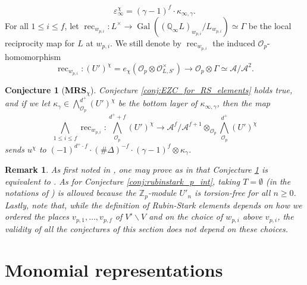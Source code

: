 \documentclass[12pt]{amsart}
\newcommand\bQ{\mathbb{Q}}
\newcommand\Zp{{\mathbb{Z}_p}}
\newcommand\cA{\mathcal{A}}
\newcommand\cO{\mathcal{O}}
\DeclareMathOperator{\Gal}{Gal}
\DeclareMathOperator{\rec}{rec}
\theoremstyle{defstyle}
\newtheorem{remark}[subsubsection]{Remark}
\theoremstyle{thmstyle}
\newtheorem{conjecture}[subsubsection]{Conjecture}
\begin{document}
$$\varepsilon_\infty^\chi = (\gamma-1)^f \cdot \kappa_{\infty,\gamma}.$$
For all $1\leq i \leq f$, let $\rec_{w_{p,i}} : L^\times \longrightarrow \Gal((\bQ_\infty L)_{w_{p,i}}/L_{w_{p,i}})\simeq \Gamma$ be the local reciprocity map for $L$ at ${w_{p,i}}$. We still denote by $\rec_{w_{p,i}}$ the induced $\cO_p$-homomorphism 
$$\rec_{w_{p,i}} : (U')^\chi=e_\chi (\cO_p\otimes \cO_{L,S'}^\times) \longrightarrow \cO_p \otimes \Gamma \simeq \cA/\cA^2.$$
\begin{conjecture}[\textbf{MRS}$_\chi$]\label{conj:MRS_chi}
	Conjecture \ref{conj:EZC_for_RS_elements} holds true, and if we let $\kappa_\gamma \in {\bigwedge}^{d^+}_{\cO_p} (U')^\chi$ be the bottom layer of $\kappa_{\infty,\gamma}$, then the map 
	$$\bigwedge_{1 \leq i \leq f} \rec_{w_{p,i}} : {\bigwedge}^{d^++f}_{\cO_p} (U')^\chi \longrightarrow \cA^f/\cA^{f+1} \otimes_{\cO_p} {\bigwedge}^{d^+}_{\cO_p} (U')^\chi$$
	sends $u^\chi$ to $(-1)^{d^+\cdot f} \cdot(\#\Delta)^{-f} \cdot (\gamma-1)^f \otimes \kappa_\gamma$.
\end{conjecture}
\begin{remark}
	As first noted in \cite[Rem. 2.10 (i)]{buyukboduksakamoto}, one may prove as in \cite[Prop. 3.13]{bullachhofer} that Conjecture \ref{conj:MRS_chi} is equivalent to \cite[Conj. 4.2, MRS($H_\infty/k$,$S$,$\emptyset$,$\chi$,$V'$)]{BKSANT}. As for Conjecture \ref{conj:rubinstark_p_int}, taking $T=\emptyset$ (in the notations of \cite{rubinstark,BKSANT}) is allowed because the $\Zp$-module $U'_n$ is torsion-free for all $n\geq 0$. Lastly, note that, while the definition of  Rubin-Stark elements depends on how we ordered the places $v_{p,1},\ldots,v_{p,f}$ of $V'\backslash V$ and on the choice of $w_{p,i}$ above $v_{p,i}$, the validity of all the conjectures of this section does not depend on these choices.
\end{remark}

\section{Monomial representations} \label{sec:monomial_representations}
\end{document}
